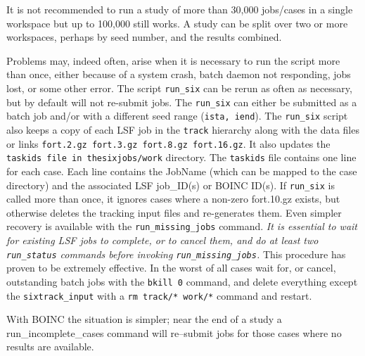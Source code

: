 \documentclass{article}    %
\begin{document}
It is not recommended to run a study of more than 30,000 jobs/cases in a
single workspace but up to 100,000 still works. A study can be split 
over two or more workspaces, perhaps by seed number, and the results combined.

Problems may, indeed often, arise when it is necessary to run the script more than once,
either because of a system crash, batch daemon not responding, jobs lost, or some other error.
The script {\tt run\_six} can be rerun as often as necessary, but by default will not re-submit
jobs. The {\tt run\_six} can either be submitted as a batch job and/or with a different seed range
({\tt ista, iend}). 
The {\tt run\_six} script also keeps a copy of each LSF job in the {\tt track}
hierarchy along with the data files or links 
{\tt fort.2.gz fort.3.gz fort.8.gz fort.16.gz}. 
It also updates the {\tt taskids file in the}{\tt sixjobs/work} directory.
The {\tt taskids} file contains one line for each case. Each line
contains the JobName (which can be mapped to the case directory) and the
associated LSF job\_ID(s) or BOINC ID(s). 
If {\tt run\_six} is called more than once, it ignores cases
where a non-zero fort.10.gz exists, but otherwise deletes the tracking input files and 
re-generates them. Even simpler recovery is available with the 
{\tt run\_missing\_jobs} command.
\emph{It is essential to wait for existing LSF jobs to complete, or to cancel them, 
and do at least two {\tt run\_status} commands before invoking {\tt run\_missing\_jobs}.}
This procedure has proven to be extremely effective.
In the worst of all cases wait for, or cancel, outstanding batch jobs 
with the {\tt bkill 0} command, 
and delete everything except the {\tt sixtrack\_input}  with a
{\tt rm track/* work/*} command and restart.  

With BOINC the situation is simpler; near the end of a study a {run\_incomplete\_cases}
command will re--submit jobs for those cases where no results are available.
\end{document}
